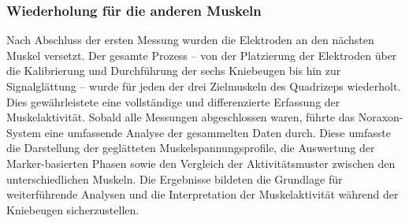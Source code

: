\subsubsection{Wiederholung für die anderen Muskeln}
Nach Abschluss der ersten Messung wurden die Elektroden an den nächsten Muskel versetzt. Der gesamte Prozess – von der Platzierung der Elektroden über die Kalibrierung und Durchführung der sechs Kniebeugen bis hin zur Signalglättung – wurde für jeden der drei Zielmuskeln des Quadrizeps wiederholt. Dies gewährleistete eine vollständige und differenzierte Erfassung der Muskelaktivität.
Sobald alle Messungen abgeschlossen waren, führte das Noraxon-System eine umfassende Analyse der gesammelten Daten durch. Diese umfasste die Darstellung der geglätteten Muskelspannungsprofile, die Auswertung der Marker-basierten Phasen sowie den Vergleich der Aktivitätsmuster zwischen den unterschiedlichen Muskeln. Die Ergebnisse bildeten die Grundlage für weiterführende Analysen und die Interpretation der Muskelaktivität während der Kniebeugen sicherzustellen.

